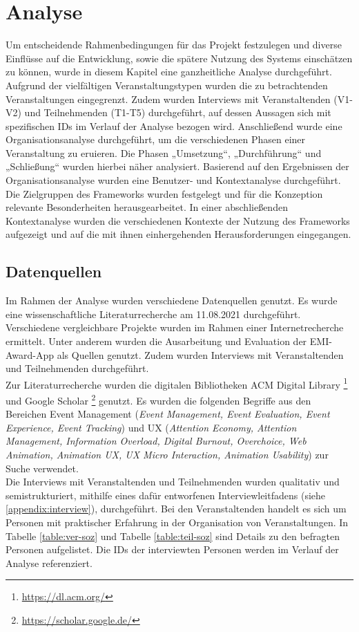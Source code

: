 \chapter{Analyse} \label{chapter:analysis}

Um entscheidende Rahmenbedingungen für das Projekt festzulegen und
diverse Einflüsse auf die Entwicklung, sowie die spätere Nutzung des Systems
einschätzen zu können, wurde in diesem Kapitel eine ganzheitliche Analyse
durchgeführt. Aufgrund der vielfältigen Veranstaltungstypen wurden die zu
betrachtenden Veranstaltungen eingegrenzt. Zudem wurden Interviews mit
Veranstaltenden (V1-V2) und Teilnehmenden  (T1-T5) durchgeführt, auf dessen
Aussagen sich mit spezifischen IDs im Verlauf der Analyse bezogen wird.
Anschließend wurde eine Organisationsanalyse durchgeführt, um die verschiedenen
Phasen einer Veranstaltung zu eruieren. Die Phasen „Umsetzung“, „Durchführung“
und „Schließung“ wurden hierbei näher analysiert. Basierend auf den Ergebnissen
der Organisationsanalyse wurden eine Benutzer- und Kontextanalyse durchgeführt.
Die Zielgruppen des Frameworks wurden festgelegt und für die Konzeption
relevante Besonderheiten herausgearbeitet. In einer abschließenden
Kontextanalyse wurden die verschiedenen Kontexte der Nutzung des Frameworks
aufgezeigt und auf die mit ihnen einhergehenden Herausforderungen eingegangen.


\section{Datenquellen}

Im Rahmen der Analyse wurden verschiedene Datenquellen genutzt. Es wurde eine
wissenschaftliche Literaturrecherche am 11.08.2021 durchgeführt. Verschiedene
vergleichbare Projekte wurden im Rahmen einer Internetrecherche ermittelt. Unter
anderem wurden die Ausarbeitung und Evaluation der EMI-Award-App als Quellen
genutzt. Zudem wurden Interviews mit Veranstaltenden und Teilnehmenden
durchgeführt. \\
Zur Literaturrecherche wurden die digitalen Bibliotheken ACM Digital
Library \footnote{\url{https://dl.acm.org/}} und Google
Scholar \footnote{\url{https://scholar.google.de/}} genutzt. Es wurden die
folgenden Begriffe aus den Bereichen Event Management (\emph{Event Management,
    Event Evaluation, Event Experience, Event Tracking}) und UX (\emph{Attention
    Economy, Attention Management, Information Overload, Digital Burnout,
    Overchoice, Web Animation, Animation UX, UX Micro Interaction, Animation
    Usability}) zur Suche verwendet. \\
Die Interviews mit Veranstaltenden und Teilnehmenden wurden qualitativ und
semistrukturiert, mithilfe eines dafür entworfenen Interviewleitfadens (siehe
\autoref{appendix:interview}), durchgeführt. Bei den Veranstaltenden handelt es sich um Personen mit
praktischer Erfahrung in der Organisation von Veranstaltungen. In Tabelle
\ref{table:ver-soz} und Tabelle \ref{table:teil-soz} sind Details zu den
befragten Personen aufgelistet. Die IDs der interviewten Personen werden im
Verlauf der Analyse referenziert.

